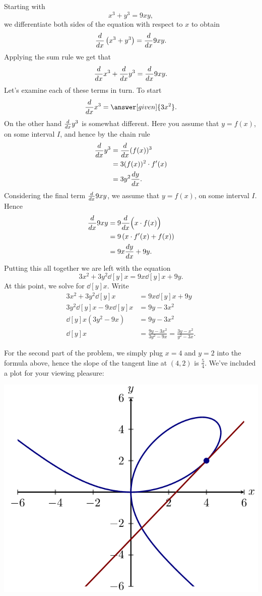 \documentclass{ximera}
\begin{document}
\begin{example}
\begin{explanation}
Starting with 
\[
x^3+y^3 = 9xy,
\]
we differentiate both sides of the
equation with respect to $x$ to obtain
\[
\ddx \left(x^3+y^3\right) = \ddx 9xy.
\]
Applying the sum rule we get that
\[
\ddx x^3+\ddx y^3 = \ddx 9xy.
\]
Let's examine each of these terms in turn. To start
\[
\ddx x^3 = \answer[given]{3x^2}.
\]
On the other hand $\ddx y^3$ is somewhat different. Here you assume that $y = f(x)$, on some interval $I$, and hence by the chain rule
\begin{align*}
\ddx y^3 &= \ddx (f(x))^3 \\ 
&= 3(f(x))^2 \cdot f'(x) \\
&= 3y^2\dd[y]{x}.
\end{align*}
Considering the final term $\ddx 9xy$, we assume that $y=f(x)$, on some interval $I$. Hence 
\begin{align*}
\ddx 9xy &= 9\ddx \Bigl(x\cdot f(x)\Bigr) \\
&= 9 \left(x\cdot f'(x) + f(x)\right)\\
&= 9x \dd[y]{x} + 9y.
\end{align*}
Putting this all together we are left with the equation
\[
3x^2 + 3y^2\dd[y]{x} =9x \dd[y]{x} + 9y.
\]
At this point, we solve for $\dd[y]{x}$. Write
\begin{align*}
3x^2 + 3y^2\dd[y]{x} &= 9x \dd[y]{x} + 9y\\
3y^2\dd[y]{x} -  9x \dd[y]{x} &= 9y - 3x^2\\
\dd[y]{x}\left(3y^2-9x\right)&= 9y - 3x^2\\
\dd[y]{x} &=\frac{9y - 3x^2}{3y^2-9x} = \frac{3y - x^2}{y^2-3x}.
\end{align*}

For the second part of the problem, we simply plug $x=4$ and $y=2$
into the formula above, hence the slope of the tangent line at $(4,2)$
is $\frac{5}{4}$. We've included a plot for your viewing pleasure:
\begin{image}
  \includegraphics{4.png}
\end{image}
\end{explanation}


\end{example}
\end{document}
